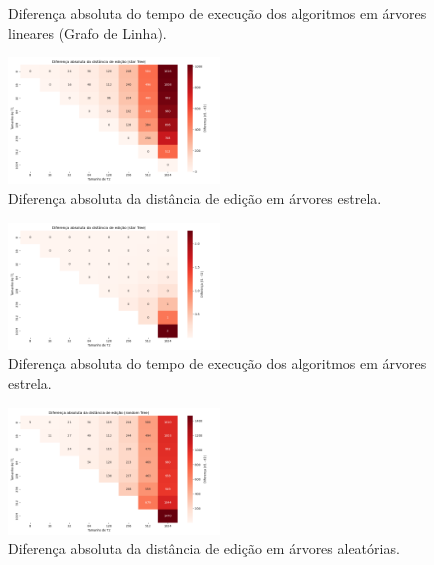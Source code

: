 \documentclass{sbc2023}%
\begin{document}
\begin{figure}[htbp]
    \centering
    \caption{ Diferença absoluta do tempo de execução dos algoritmos em árvores lineares (Grafo de Linha). }
    \label{fig:exemplo}
\end{figure}


\begin{figure}[htbp]
    \centering
    \includegraphics[width=0.5\textwidth]{images/heatmap_diff_edit_distance_star_tree.png}
    \caption{ Diferença absoluta da distância de edição em árvores estrela. }
    \label{fig:exemplo}
\end{figure}

\begin{figure}[htbp]
    \centering
    \includegraphics[width=0.5\textwidth]{images/heatmap_diff_time_taken_star_tree.png}
    \caption{ Diferença absoluta do tempo de execução dos algoritmos em árvores estrela. }
    \label{fig:exemplo}
\end{figure}


\begin{figure}[htbp]
    \centering
    \includegraphics[width=0.5\textwidth]{images/heatmap_diff_edit_distance_random_tree.png}
    \caption{ Diferença absoluta da distância de edição em árvores aleatórias. }
    \label{fig:exemplo}
\end{figure}
\end{document}
